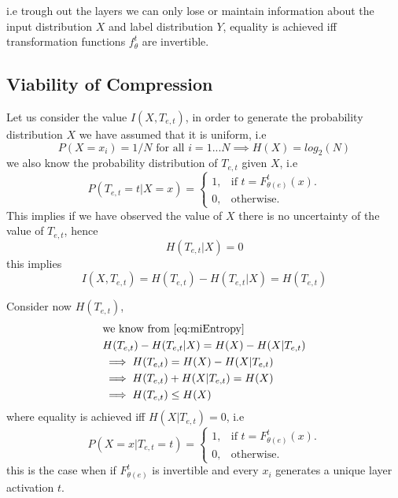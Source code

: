 i.e trough out the layers we can only lose or maintain information about the
input distribution $X$ and label distribution $Y$, equality is achieved iff
transformation functions $f_{\theta}^t$ are invertible.

\subsection{Viability of Compression}

Let us consider the value $I(X, T_{e,t})$, in order to generate the probability
distribution $X$ we have assumed that it is uniform, i.e
\begin{equation*}
  P(X=x_i) = 1 / N \text{ for all } i = 1...N \implies H(X) = log_2(N)
\end{equation*}
we also know the probability distribution of $T_{e,t}$ given $X$, i.e
\begin{equation*}
  P(T_{e,t}=t|X=x) = \begin{cases}
    1, & \text{if } t = F_{\theta(e)}^t(x). \\
    0, & \text{otherwise}.
  \end{cases}
\end{equation*}
This implies if we have observed the value of $X$ there is no uncertainty of the
value of $T_{e,t}$, hence 
\begin{equation*}
  H(T_{e,t}|X) = 0
\end{equation*}
this implies
\begin{equation*}
  I(X, T_{e,t}) = H(T_{e,t}) - H(T_{e,t} | X) = H(T_{e,t})
\end{equation*}

Consider now $H(T_{e,t})$,
\begin{align}
  &\text{we know from \autoref{eq:miEntropy} } \nonumber \\
  &H(T_{e,t}) - H(T_{e,t}|X) = H(X) - H(X|T_{e,t}) \nonumber \\
  &\implies H(T_{e,t}) = H(X) - H(X|T_{e,t}) \nonumber \\
  &\implies H(T_{e,t}) + H(X|T_{e,t}) = H(X) \nonumber \\
  &\implies H(T_{e,t}) \leq H(X)
\label{eq:hh}
\end{align}
where equality is achieved iff $H(X|T_{e,t})=0$, i.e
\begin{equation*}
  P(X=x|T_{e,t}=t) = \begin{cases}
    1, & \text{if } t = F_{\theta(e)}^t(x). \\
    0, & \text{otherwise}.
  \end{cases}
\end{equation*}
this is the case when if $F_{\theta(e)}^t$ is invertible and every $x_i$
generates a unique layer activation $t$.

